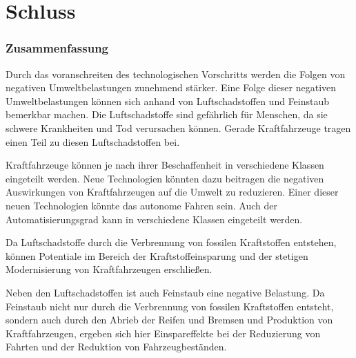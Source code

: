 \chapter{Schluss}

\subsection{Zusammenfassung}
Durch das voranschreiten des technologischen Vorschritts werden die Folgen von negativen Umweltbelastungen zunehmend stärker.
Eine Folge dieser negativen Umweltbelastungen können sich anhand von Luftschadstoffen und Feinstaub bemerkbar machen.
Die Luftschadstoffe sind gefährlich für Menschen, da sie schwere Krankheiten und Tod verursachen können.
Gerade Kraftfahrzeuge tragen einen Teil zu diesen Luftschadstoffen bei.

Kraftfahrzeuge können je nach ihrer Beschaffenheit in verschiedene Klassen eingeteilt werden.
Neue Technologien könnten dazu beitragen die negativen Auswirkungen von Kraftfahrzeugen auf die Umwelt zu reduzieren.
Einer dieser neuen Technologien könnte das autonome Fahren sein.
Auch der Automatisierungsgrad kann in verschiedene Klassen eingeteilt werden.

Da Luftschadstoffe durch die Verbrennung von fossilen Kraftstoffen entstehen,
können Potentiale im Bereich der Kraftstoffeinsparung und der stetigen Modernisierung von Kraftfahrzeugen erschließen.

Neben den Luftschadstoffen ist auch Feinstaub eine negative Belastung.
Da Feinstaub nicht nur durch die Verbrennung von fossilen Kraftstoffen entsteht,
sondern auch durch den Abrieb der Reifen und Bremsen und Produktion von Kraftfahrzeugen,
ergeben sich hier Einspareffekte bei der Reduzierung von Fahrten und der Reduktion von Fahrzeugbeständen.

